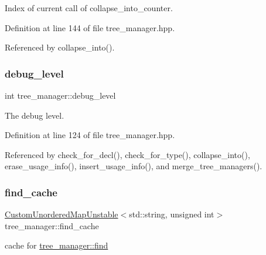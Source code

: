 Index of current call of collapse\+\_\+into\+\_\+counter. 



Definition at line 144 of file tree\+\_\+manager.\+hpp.



Referenced by collapse\+\_\+into().

\mbox{\label{classtree__manager_af7704af4a3b503f0277fe1fa9beccd52}} 
\subsubsection{\texorpdfstring{debug\+\_\+level}{debug\_level}}
{\footnotesize\ttfamily int tree\+\_\+manager\+::debug\+\_\+level\hspace{0.3cm}{\ttfamily [private]}}



The debug level. 



Definition at line 124 of file tree\+\_\+manager.\+hpp.



Referenced by check\+\_\+for\+\_\+decl(), check\+\_\+for\+\_\+type(), collapse\+\_\+into(), erase\+\_\+usage\+\_\+info(), insert\+\_\+usage\+\_\+info(), and merge\+\_\+tree\+\_\+managers().

\mbox{\label{classtree__manager_adf640d56670e9252b7bf03930d953d7c}} 
\subsubsection{\texorpdfstring{find\+\_\+cache}{find\_cache}}
{\footnotesize\ttfamily \hyperlink{custom__map_8hpp_a8cbaceffc09790a885ec7e9c17809c69}{Custom\+Unordered\+Map\+Unstable}$<$std\+::string, unsigned int$>$ tree\+\_\+manager\+::find\+\_\+cache\hspace{0.3cm}{\ttfamily [private]}}



cache for \hyperlink{classtree__manager_aeb1203c36b76b27e3b322d4a8cfc55d8}{tree\+\_\+manager\+::find} 



